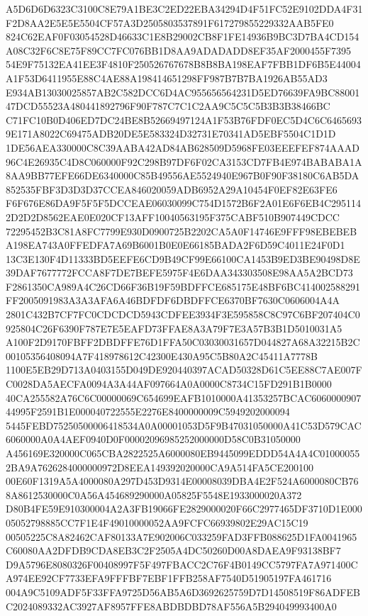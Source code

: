 \documentclass[UTF8,fontset=fandol,zihao=-4,a4paper]{ctexart}
\begin{document}
{{A5D6D6D6323C3100C8E79A1BE3C2ED22EBA34294D4F51FC52E9102DDA4F31F2D8AA2E5E5E5504CF57A3D2505803537891F617279855229332AAB5FE0
824C62EAF0F03054528D46633C1E8B29002CB8F1FE14936B9BC3D7BA4CD154A08C32F6C8E75F89CC7FC076BB1D8AA9ADADADD8EF35AF2000455F7395
54E9F75132EA41EE3F4810F250526767678B8B8BA198EAF7FBB1DF6B5E44004A1F53D6411955E88C4AE88A198414651298FF987B7B7BA1926AB55AD3
E934AB13030025857AB2C582DCC6D4AC955656564231D5ED76639FA9BC8800147DCD55523A480441892796F90F787C7C1C2AA9C5C5C5B3B3B38466BC
C71FC10B0D406ED7DC24BE8B52669497124A1F53B76FDF0EC5D4C6C64656939E171A8022C69475ADB20DE5E583324D32731E70341AD5EBF5504C1D1D
1DE56AEA330000C8C39AABA42AD84AB628509D5968FE03EEEFEF874AAAD96C4E26935C4D8C060000F92C298B97DF6F02CA3153CD7FB4E974BABABA1A
8AA9BB77EFE66DE6340000C85B49556AE5524940E967B0F90F38180C6AB5DA852535FBF3D3D3D37CCEA846020059ADB6952A29A10454F0EF82E63FE6
F6F676E86DA9F5F5F5DCCEAE06030099C754D1572B6F2A01E6F6EB4C2951142D2D2D8562EAE0E020CF13AFF10040563195F375CABF510B907449CDCC
72295452B3C81A8FC7799E930D0900725B2202CA5A0F14746E9FFF98EBEBEBA198EA743A0FFEDFA7A69B6001B0E0E66185BADA2F6D59C4011E24F0D1
13C3E130F4D11333BD5EEFE6CD9B49CF99E66100CA1453B9ED3BE90498D8E39DAF7677772FCCA8F7DE7BEFE5975F4E6DAA343303508E98AA5A2BCD73
F2861350CA989A4C26CD66F36B19F59BDFFCE685175E48BF6BC414002588291FF2005091983A3A3AFA6A46BDFDF6DBDFFCE6370BF7630C0606004A4A
2801C432B7CF7FC0CDCDCD5943CDFEE3934F3E595858C8C97C6BF207404C0925804C26F6390F787E7E5EAFD73FFAE8A3A79F7E3A57B3B1D5010031A5
A100F2D9170FBFF2DBDFFE76D1FFA50C03030031657D044827A68A32215B2C00105356408094A7F418978612C42300E430A95C5B80A2C45411A7778B
1100E5EB29D713A0403155D049DE920440397ACAD50328D61C5EE88C7AE007FC0028DA5AECFA0094A3A44AF097664A0A0000C8734C15FD291B1B0000
40CA255582A76C6C00000069C654699EAFB1010000A41353257BCAC606000090744995F2591B1E000040722555E2276E8400000009C5949202000094
5445FEBD75250500006418534A0A00001053D5F9B47031050000A41C53D579CAC6060000A0A4AEF0940D0F00002096985252000000D58C0B31050000
A456169E320000C065CBA2822525A6000080EB9445099EDDD54A4A4C010000552BA9A7626284000000972D8EEA149392020000CA9A514FA5CE200100
00E60F1319A5A4000080A297D453D9314E00008039DBA4E2F524A6000080CB768A8612530000C0A56A454689290000A05825F5548E1933000020A372
D80B4FE59E910300004A2A3FB19066FE2829000020F66C2977465DF3710D1E00005052798885CC7F1E4F49010000052AA9FCFC66939802E29AC15C19
00505225C8A82462CAF80133A7E902006C033259FAD3FFB088625D1FA0041965C60080AA2DFDB9CDA8EB3C2F2505A4DC50260D00A8DAEA9F93138BF7
D9A5796E8080326F00408997F5F497FBACC2C76F4B0149CC5797FA7A971400CA974EE92CF7733EFA9FFFBF7EBF1FFB258AF7540D51905197FA461716
004A9C5109ADF5F33FFA9725D56AB5A6D3692625759D7D14508519F86ADFEBC2024089332AC3927AF8957FFE8ABDBDBD78AF556A5B294049993400A0
}}
\end{document}
